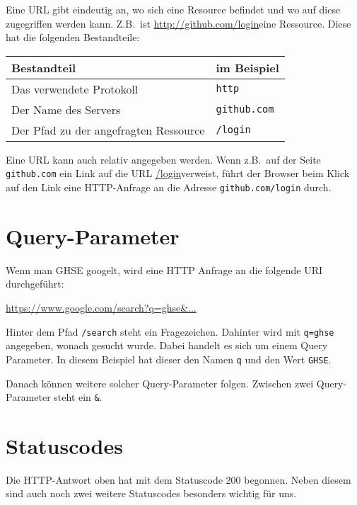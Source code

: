 \documentclass[a4paper]{scrartcl}
\begin{document}
Eine URL gibt eindeutig an, wo sich eine Resource befindet und wo auf diese zugegriffen werden kann.
Z.B.\ ist \url{http://github.com/login}eine Ressource.
Diese hat die folgenden Bestandteile:

\begin{table}[H]
\begin{tabular}{ll}

Bestandteil & im Beispiel \\
\hline
Das verwendete Protokoll & \texttt{http}\\

Der Name des Servers & \texttt{github.com}  \\

Der Pfad zu der angefragten Ressource & \texttt{/login}   \\

\end{tabular}\label{tab:table}
\end{table}




Eine URL kann auch relativ angegeben werden.
Wenn z.B.\ auf der Seite \texttt{github.com} ein Link auf die URL \url{/login}verweist, führt der Browser beim Klick auf den Link eine HTTP-Anfrage an die Adresse \texttt{github.com/login} durch.

\section{Query-Parameter}\label{sec:query-parameter}

Wenn man GHSE googelt, wird eine HTTP Anfrage an die folgende URI durchgeführt:

\url{https://www.google.com/search?q=ghse&...}

Hinter dem Pfad \texttt{/search} steht ein Fragezeichen.
Dahinter wird mit \texttt{q=ghse} angegeben, wonach gesucht wurde.
Dabei handelt es sich um einem Query Parameter.
In diesem Beispiel hat dieser den Namen \texttt{q} und den Wert \texttt{GHSE}.


Danach können weitere solcher Query-Parameter folgen.
Zwischen zwei Query-Parameter steht ein \texttt{\&}.


\section{Statuscodes}\label{sec:statuscodes}

Die HTTP-Antwort oben hat mit dem Statuscode $200$ begonnen.
Neben diesem sind auch noch zwei weitere Statuscodes besonders wichtig für uns.
\end{document}
